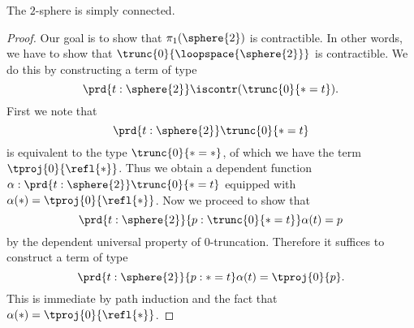 \begin{cor}
The $2$-sphere is simply connected.
\end{cor}

\begin{proof}
Our goal is to show that $\pi_1(\sphere{2})$ is contractible. In other words, we have to show that $\trunc{0}{\loopspace{\sphere{2}}}$ is contractible. We do this by constructing a term of type
\begin{equation*}
\prd{t:\sphere{2}}\iscontr(\trunc{0}{\ast=t}).
\end{equation*}
First we note that
\begin{equation*}
\prd{t:\sphere{2}}\trunc{0}{\ast=t}
\end{equation*}
is equivalent to the type $\trunc{0}{\ast=\ast}$, of which we have the term $\tproj{0}{\refl{\ast}}$. Thus we obtain a dependent function $\alpha:\prd{t:\sphere{2}}\trunc{0}{\ast=t}$ equipped with $\alpha(\ast)=\tproj{0}{\refl{\ast}}$. Now we proceed to show that
\begin{equation*}
\prd{t:\sphere{2}}{p:\trunc{0}{\ast=t}} \alpha(t)=p
\end{equation*}
by the dependent universal property of $0$-truncation. Therefore it suffices to construct a term of type
\begin{equation*}
\prd{t:\sphere{2}}{p:\ast=t}\alpha(t)=\tproj{0}{p}.
\end{equation*}
This is immediate by path induction and the fact that $\alpha(\ast)=\tproj{0}{\refl{\ast}}$.
\end{proof}

